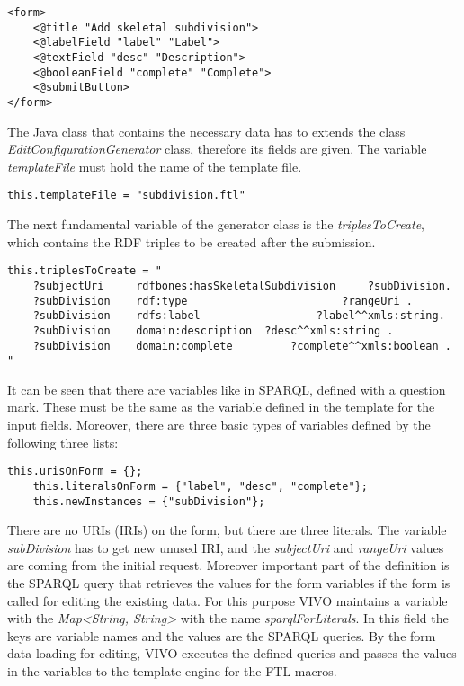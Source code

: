 \newpage
\begin{lstlisting}[captionpos=b, caption= subdivision.ftl, label=skullJSON, belowskip=1em, aboveskip=2em,
basicstyle=\footnotesize,frame=single]
<form>
	<@title "Add skeletal subdivision">
	<@labelField "label" "Label">
	<@textField	"desc" "Description">
	<@booleanField "complete" "Complete">
	<@submitButton>
</form>	
\end{lstlisting}

The Java class that contains the necessary data has to extends the class \textit{EditConfigurationGenerator} class, therefore its fields are given. The variable \textit{templateFile} must hold the name of the template file.

\begin{lstlisting}[captionpos=b, caption= Form defintion in Java, label=skullJSON, belowskip=1em, aboveskip=2em,
basicstyle=\footnotesize,frame=single]
	this.templateFile = "subdivision.ftl"
\end{lstlisting}

The next fundamental variable of the generator class is the \textit{triplesToCreate}, which contains the RDF triples to be created after the submission.

\begin{lstlisting}[captionpos=b, caption= RDF Triples to create, label=skullJSON, belowskip=1em, aboveskip=2em,
basicstyle=\footnotesize,frame=single]
this.triplesToCreate = "
	?subjectUri		rdfbones:hasSkeletalSubdivision		?subDivision.
	?subDivision	rdf:type						?rangeUri .
	?subDivision	rdfs:label					?label^^xmls:string.
	?subDivision	domain:description	?desc^^xmls:string .
	?subDivision	domain:complete			?complete^^xmls:boolean . "
\end{lstlisting}

It can be seen that there are variables like in SPARQL, defined with a question mark. These must be the same as the variable defined in the template for the input fields. Moreover, there are three basic types of variables defined by the following three lists:

\begin{lstlisting}[captionpos=b, caption= Variable type definition, label=skullJSON, belowskip=1em, aboveskip=2em,
basicstyle=\footnotesize,frame=single]
	this.urisOnForm = {};
	this.literalsOnForm	= {"label", "desc", "complete"};
	this.newInstances = {"subDivision"};
\end{lstlisting}

There are no URIs (IRIs) on the form, but there are three literals. The variable \textit{subDivision} has to get new unused IRI, and the \textit{subjectUri} and \textit{rangeUri} values are coming from the initial request. Moreover important part of the definition is the SPARQL query that retrieves the values for the form variables if the form is called for editing the existing data. For this purpose VIVO maintains a variable with the \textit{Map<String, String>} with the name \textit{sparqlForLiterals}. In this field the keys are variable names and the values are the SPARQL queries. By the form data loading for editing, VIVO executes the defined queries and passes the values in the variables to the template engine for the FTL macros.

